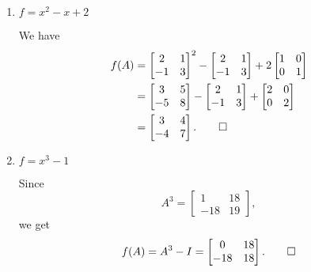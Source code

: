 \begin{enumerate}
\item $f = x^2 - x + 2$
  \begin{solution}
    We have
    \begin{align*}
      f(A)
      &=
      \begin{bmatrix}
        2 & 1 \\
        -1 & 3
      \end{bmatrix}^2
      -
      \begin{bmatrix}
        2 & 1 \\
        -1 & 3
      \end{bmatrix}
      + 2
      \begin{bmatrix}
        1 & 0 \\
        0 & 1
      \end{bmatrix} \\
      &=
      \begin{bmatrix}
        3 & 5 \\
        -5 & 8
      \end{bmatrix}
      -
      \begin{bmatrix}
        2 & 1 \\
        -1 & 3
      \end{bmatrix}
      +
      \begin{bmatrix}
        2 & 0 \\
        0 & 2
      \end{bmatrix} \\
      &=
      \begin{bmatrix}
        3 & 4 \\
        -4 & 7
      \end{bmatrix}. \qedhere
    \end{align*}
  \end{solution}

\item $f = x^3 - 1$
  \begin{solution}
    Since
    \begin{equation*}
      A^3 =
      \begin{bmatrix}
        1 & 18 \\
        -18 & 19
      \end{bmatrix},
    \end{equation*}
    we get
    \begin{equation*}
      f(A) = A^3 - I =
      \begin{bmatrix}
        0 & 18 \\
        -18 & 18
      \end{bmatrix}. \qedhere
    \end{equation*}
  \end{solution}


\end{enumerate}
